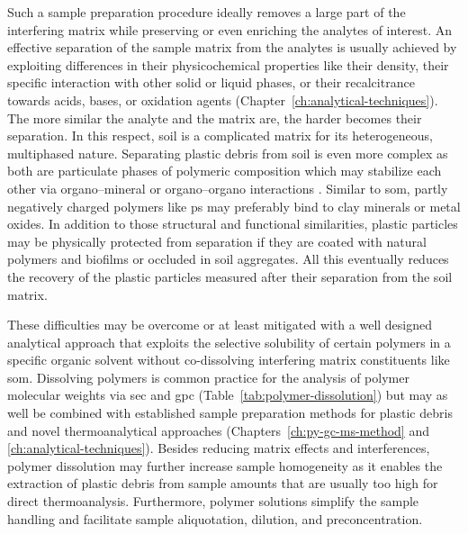 Such a sample preparation procedure ideally removes a large part of the interfering matrix while preserving or even enriching the analytes of interest.
An effective separation of the sample matrix from the analytes is usually achieved by exploiting differences in their physicochemical properties like their density, their specific interaction with other solid or liquid phases, or their recalcitrance towards acids, bases, or oxidation agents (Chapter~\ref{ch:analytical-techniques}). The more similar the analyte and the matrix are, the harder becomes their separation.
In this respect, soil is a complicated matrix for its heterogeneous, multiphased nature. Separating plastic debris from soil is even more complex as both are particulate phases of polymeric composition which may stabilize each other via organo--mineral or organo--organo interactions \citep{LuoDistribution2020,SchaumannSoil2006}. Similar to \ac{som}, partly negatively charged polymers like \ac{ps} may preferably bind to clay minerals or metal oxides. In addition to those structural and functional similarities, plastic particles may be physically protected from separation if they are coated with natural polymers and biofilms or occluded in soil aggregates. All this eventually reduces the recovery of the plastic particles measured after their separation from the soil matrix.

These difficulties may be overcome or at least mitigated with a well designed analytical approach that exploits the selective solubility of certain polymers in a specific organic solvent without co-dissolving interfering matrix constituents like \ac{som}. Dissolving polymers is common practice for the analysis of polymer molecular weights via \ac{sec} and \ac{gpc} (Table~\ref{tab:polymer-dissolution}) but may as well be combined with established sample preparation methods for plastic debris and novel thermoanalytical approaches (Chapters~\ref{ch:py-gc-ms-method} and \ref{ch:analytical-techniques}). Besides reducing matrix effects and interferences, polymer dissolution may further increase sample homogeneity as it enables the extraction of plastic debris from sample amounts that are usually too high for direct thermoanalysis. Furthermore, polymer solutions simplify the sample handling and facilitate sample aliquotation, dilution, and preconcentration.

